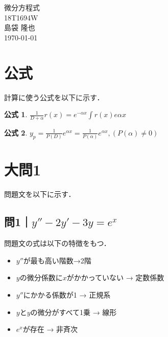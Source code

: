 \documentclass[a4paper,11pt]{bxjsarticle}
\newtheorem{mf}{公式}
\begin{document}
\begin{titlepage}
  \begin{center}
    \vspace*{150truept}
    {\Huge 微分方程式}\\ %
    \vspace{120truept}
    {\huge 18T1694W}\\ %
    \vspace{50truept}
    {\huge 島袋 隆也}\\ %
    \vspace{50truept}
    {\huge \today}\\ %
  \end{center}
\end{titlepage}



\section{公式}
計算に使う公式を以下に示す．
\begin{mf}
  $\frac{1}{D+\alpha}r(x) = e^{-\alpha x}\int r(x)e{\alpha x}$
  \label{mf:1}
\end{mf}
\begin{mf}
  $y_p=\frac{1}{P(D)}e^{\alpha x} = \frac{1}{P(\alpha)}e^{\alpha x}, (P(\alpha)\neq 0)$
  \label{mf:2}
\end{mf}

          

\section{大問1}
問題文を以下に示す．
\subsection{問1｜$y''-2y'-3y=e^x$}
問題文の式は以下の特徴をもつ．

\begin{itemize}
  \item $y''$が最も高い階数→2階
  \item $y$の微分係数に$x$がかかっていない → 定数係数
  \item $y''$にかかる係数が1 → 正規系
  \item $y$と$y$の微分がすべて1乗 → 線形
  \item $e^x$が存在 → 非斉次
\end{itemize}
\end{document}
